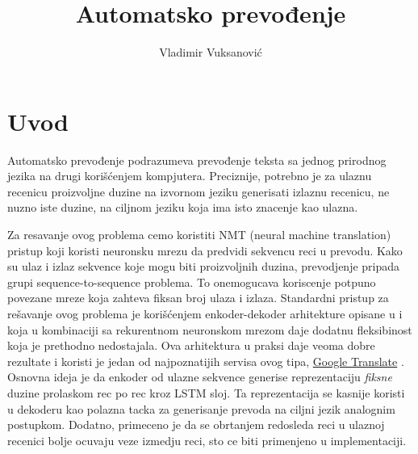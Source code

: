 \documentclass[a4paper]{article}
\title{Automatsko prevođenje}
\author{Vladimir Vuksanović}
\affil{Matematički fakultet}
\date{}
\begin{document}
\maketitle

\section{Uvod}

Automatsko prevođenje podrazumeva prevođenje teksta sa jednog prirodnog jezika na drugi korišćenjem kompjutera. Preciznije, potrebno je za ulaznu recenicu proizvoljne duzine na izvornom jeziku generisati izlaznu recenicu, ne nuzno iste duzine, na ciljnom jeziku koja ima isto znacenje kao ulazna. 

Za resavanje ovog problema cemo koristiti NMT (neural machine translation) pristup koji koristi neuronsku mrezu da predvidi sekvencu reci u prevodu. 
Kako su ulaz i izlaz sekvence koje mogu biti proizvoljnih duzina, prevodjenje pripada grupi sequence-to-sequence problema. To onemogucava koriscenje potpuno povezane mreze koja zahteva fiksan broj ulaza i izlaza. 
Standardni pristup za rešavanje ovog problema je korišćenjem enkoder-dekoder arhitekture opisane u \cite{sutskever2014sequence} i \cite{cho2014learning} koja u kombinaciji sa rekurentnom neuronskom mrezom daje dodatnu fleksibinost koja je prethodno nedostajala. Ova arhitektura u praksi daje veoma dobre rezultate i koristi je jedan od najpoznatijih servisa ovog tipa, \href{https://translate.google.com/}{Google Translate} \cite{wu2016googles}. 
Osnovna ideja je da enkoder od ulazne sekvence generise reprezentaciju \textit{fiksne} duzine prolaskom rec po rec kroz LSTM sloj. Ta reprezentacija se kasnije koristi u dekoderu kao polazna tacka za generisanje prevoda na ciljni jezik analognim postupkom. Dodatno, primeceno je da se obrtanjem redosleda reci u ulaznoj recenici bolje ocuvaju veze izmedju reci, sto ce biti primenjeno u implementaciji.

\end{document}
